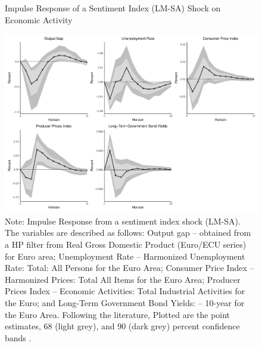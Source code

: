 \begin{figure}[!h]
    \centering
    \caption{Impulse Response of a Sentiment Index (LM-SA) Shock on Economic Activity}
    \includegraphics[width=\textwidth]{images/irf_lm.pdf}
    \caption*{Note: Impulse Response from a sentiment index shock (LM-SA). The variables are described as follows: Output gap -- obtained from a HP filter from Real Gross Domestic Product (Euro/ECU series) for Euro area; Unemployment Rate -- Harmonized Unemployment Rate: Total: All Persons for the Euro Area; Consumer Price Index -- Harmonized Prices: Total All Items for the Euro Area; Producer Prices Index -- Economic Activities: Total Industrial Activities for the Euro; and Long-Term Government Bond Yields: -- 10-year for the Euro Area. Following the literature, Plotted are the point estimates, 68 (light grey), and 90 (dark grey) percent confidence bands \cite[p. 40]{shapiro2020measuring}.}
    \label{fig:irflm}
\end{figure}


